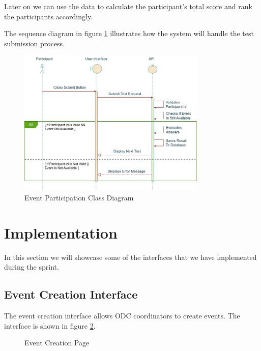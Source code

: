 Later on we can use the data to calculate the participant's total score and rank the participants accordingly.

The sequence diagram in figure \ref{fig:event_participation_class_diagram} illustrates
how the system will handle the test submission process.

\begin{figure}[h!]
  \centering
  \includegraphics[width=0.8\textwidth]{images/sequencePassTest.png}
  \caption{Event Participation Class Diagram}\label{fig:event_participation_class_diagram}
\end{figure}


\section{Implementation}

In this section we will showcase some of the interfaces that we have implemented during the sprint.

\subsection{Event Creation Interface}
The event creation interface allows ODC coordinators to create events. The interface is shown in figure \ref{fig:event_creation_interface}.

\begin{figure}
  \centering
  \setlength\fboxsep{0pt} %
  \setlength\fboxrule{2pt} %
  \caption{Event Creation Page}\label{fig:event_creation_interface}
\end{figure}

